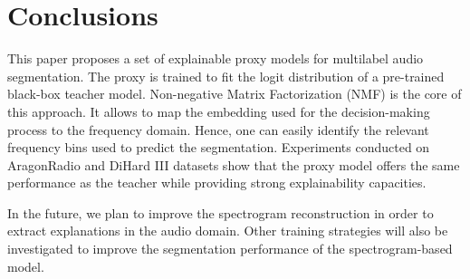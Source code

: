 \section{Conclusions}
\label{sect:ccl}
This paper proposes a set of explainable proxy models for multilabel audio segmentation.
The proxy is trained to fit the logit distribution of a pre-trained black-box teacher model.
Non-negative Matrix Factorization (NMF) is the core of this approach.
It allows to map the embedding used for the decision-making process to the frequency domain.
Hence, one can easily identify the relevant frequency bins used to predict the segmentation.
Experiments conducted on AragonRadio and DiHard III datasets show that the proxy model offers the same performance as the teacher while providing strong explainability capacities.

In the future, we plan to improve the spectrogram reconstruction in order to extract explanations in the audio domain.
Other training strategies will also be investigated to improve the segmentation performance of the spectrogram-based model.
